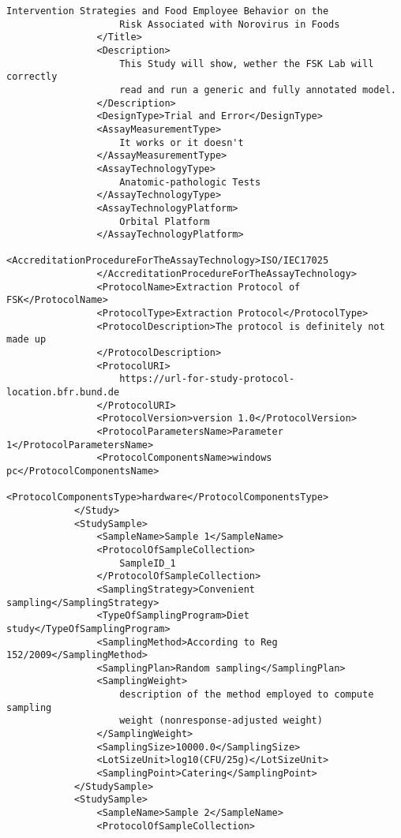 \documentclass[a4paper]{report}
\begin{document}
\begin{lstlisting}[language=RAKIP, caption={Example of StudySample}]
                    Intervention Strategies and Food Employee Behavior on the
                    Risk Associated with Norovirus in Foods
                </Title>
                <Description>
                    This Study will show, wether the FSK Lab will correctly
                    read and run a generic and fully annotated model.
                </Description>
                <DesignType>Trial and Error</DesignType>
                <AssayMeasurementType>
                    It works or it doesn't
                </AssayMeasurementType>
                <AssayTechnologyType>
                    Anatomic-pathologic Tests
                </AssayTechnologyType>
                <AssayTechnologyPlatform>
                    Orbital Platform
                </AssayTechnologyPlatform>
                <AccreditationProcedureForTheAssayTechnology>ISO/IEC17025
                </AccreditationProcedureForTheAssayTechnology>
                <ProtocolName>Extraction Protocol of FSK</ProtocolName>
                <ProtocolType>Extraction Protocol</ProtocolType>
                <ProtocolDescription>The protocol is definitely not made up
                </ProtocolDescription>
                <ProtocolURI>
                    https://url-for-study-protocol-location.bfr.bund.de
                </ProtocolURI>
                <ProtocolVersion>version 1.0</ProtocolVersion>
                <ProtocolParametersName>Parameter 1</ProtocolParametersName>
                <ProtocolComponentsName>windows pc</ProtocolComponentsName>
                <ProtocolComponentsType>hardware</ProtocolComponentsType>
            </Study>
            <StudySample>
                <SampleName>Sample 1</SampleName>
                <ProtocolOfSampleCollection>
                    SampleID_1
                </ProtocolOfSampleCollection>
                <SamplingStrategy>Convenient sampling</SamplingStrategy>
                <TypeOfSamplingProgram>Diet study</TypeOfSamplingProgram>
                <SamplingMethod>According to Reg 152/2009</SamplingMethod>
                <SamplingPlan>Random sampling</SamplingPlan>
                <SamplingWeight>
                    description of the method employed to compute sampling
                    weight (nonresponse-adjusted weight)
                </SamplingWeight>
                <SamplingSize>10000.0</SamplingSize>
                <LotSizeUnit>log10(CFU/25g)</LotSizeUnit>
                <SamplingPoint>Catering</SamplingPoint>
            </StudySample>
            <StudySample>
                <SampleName>Sample 2</SampleName>
                <ProtocolOfSampleCollection>

\end{lstlisting}
\end{document}
